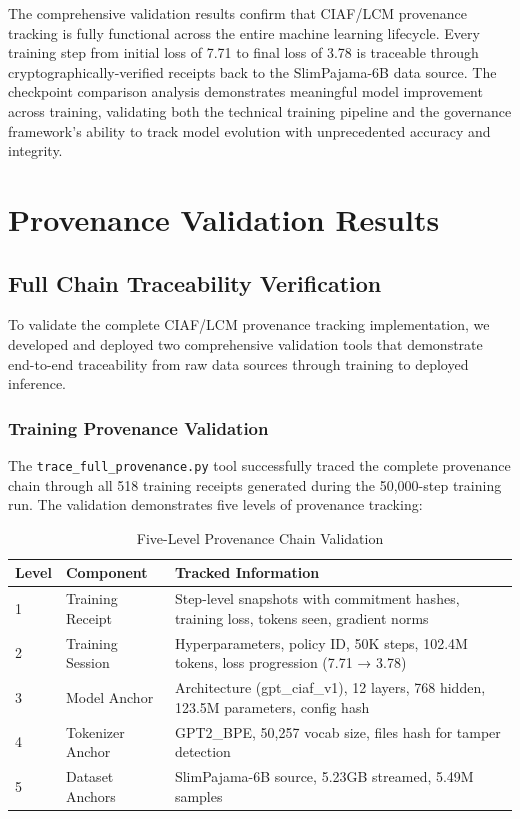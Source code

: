 \documentclass[11pt,a4paper]{article}
\begin{document}
The comprehensive validation results confirm that CIAF/LCM provenance tracking is fully functional across the entire machine learning lifecycle. Every training step from initial loss of 7.71 to final loss of 3.78 is traceable through cryptographically-verified receipts back to the SlimPajama-6B data source. The checkpoint comparison analysis demonstrates meaningful model improvement across training, validating both the technical training pipeline and the governance framework's ability to track model evolution with unprecedented accuracy and integrity.

\section{Provenance Validation Results}

\subsection{Full Chain Traceability Verification}

To validate the complete CIAF/LCM provenance tracking implementation, we developed and deployed two comprehensive validation tools that demonstrate end-to-end traceability from raw data sources through training to deployed inference.

\subsubsection{Training Provenance Validation}

The \texttt{trace\_full\_provenance.py} tool successfully traced the complete provenance chain through all 518 training receipts generated during the 50,000-step training run. The validation demonstrates five levels of provenance tracking:

\begin{table}[H]
\centering
\begin{tabular}{llp{7cm}}
\toprule
\textbf{Level} & \textbf{Component} & \textbf{Tracked Information} \\
\midrule
1 & Training Receipt & Step-level snapshots with commitment hashes, training loss, tokens seen, gradient norms \\
2 & Training Session & Hyperparameters, policy ID, 50K steps, 102.4M tokens, loss progression (7.71 → 3.78) \\
3 & Model Anchor & Architecture (gpt\_ciaf\_v1), 12 layers, 768 hidden, 123.5M parameters, config hash \\
4 & Tokenizer Anchor & GPT2\_BPE, 50,257 vocab size, files hash for tamper detection \\
5 & Dataset Anchors & SlimPajama-6B source, 5.23GB streamed, 5.49M samples \\
\bottomrule
\end{tabular}
\caption{Five-Level Provenance Chain Validation}
\label{tab:provenance-levels}
\end{table}
\end{document}
